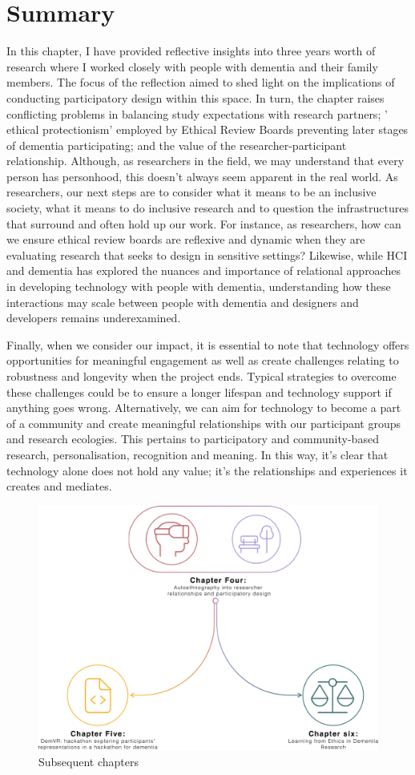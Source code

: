 \section{Summary}
\label{Relationships:Summary}
In this chapter, I have provided reflective insights into three years worth of research where I worked closely with people with dementia and their family members. The focus of the reflection aimed to shed light on the implications of conducting participatory design within this space. In turn, the chapter raises conflicting problems in balancing study expectations with research partners; ' ethical protectionism' employed by Ethical Review Boards preventing later stages of dementia participating; and the value of the researcher-participant relationship. Although, as researchers in the field, we may understand that every person has personhood, this doesn't always seem apparent in the real world. As researchers, our next steps are to consider what it means to be an inclusive society, what it means to do inclusive research and to question the infrastructures that surround and often hold up our work. For instance, as researchers, how can we ensure ethical review boards are reflexive and dynamic when they are evaluating research that seeks to design in sensitive settings? Likewise, while HCI and dementia has explored the nuances and importance of relational approaches in developing technology with people with dementia, understanding how these interactions may scale between people with dementia and designers and developers remains underexamined.

Finally, when we consider our impact, it is essential to note that technology offers opportunities for meaningful engagement as well as create challenges relating to robustness and longevity when the project ends. Typical strategies to overcome these challenges could be to ensure a longer lifespan and technology support if anything goes wrong. Alternatively, we can aim for technology to become a part of a community and create meaningful relationships with our participant groups and research ecologies. This pertains to participatory and community-based research, personalisation, recognition and meaning. In this way, it's clear that technology alone does not hold any value; it's the relationships and experiences it creates and mediates.

\begin{figure}[htp]
\centering
\includegraphics[width=0.6\linewidth]{Images/Thesis_Narrative/Narrative_ChapterFour.png}
\caption{Subsequent chapters}
\label{fig:ChapterFour_FutureStudies}
\end{figure}

